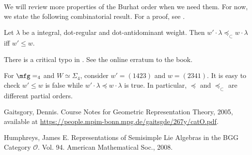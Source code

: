 	We will review more properties of the Burhat order when we need them. For now, we state the following combinatorial result. For a proof, see \cite[Sect. 5.2]{H}.

	\begin{prop}
		Let $\lambda$ be a integral, dot-regular and dot-antidominant weight. Then $w'\cdot \lambda \preceq_\subset w\cdot \lambda$ iff $w' \le w$.
	\end{prop}

	\begin{warn}
		There is a critical typo in \cite[Sect. 5.2]{H}. See the online erratum to the book.
	\end{warn}

	\begin{exam}
		\label{exam-Burhat-is-coarser}
		For $\mfg = \sl_4$ and $W\simeq \Sigma_4$, consider $w'=(1423)$ and $w=(2341)$. It is easy to check $w'\le w$ is false while $w'\cdot \lambda \preceq w\cdot \lambda$ is true. In particular, $\preceq$ and $\preceq_\subset$ are different partial orders.

	\end{exam}


\begin{thebibliography}{Yau}
	
	 Gaitsgory, Dennis. Course Notes for Geometric Representation Theory, 2005, available at \url{https://people.mpim-bonn.mpg.de/gaitsgde/267y/catO.pdf}.

	 Humphreys, James E. Representations of Semisimple Lie Algebras in the BGG Category $\mathcal{O} $. Vol. 94. American Mathematical Soc., 2008.

\end{thebibliography}


 


